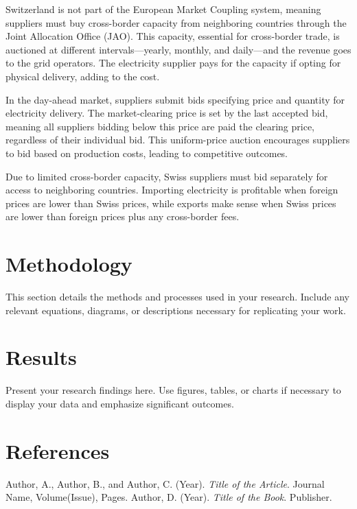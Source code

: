 \documentclass[12pt]{article}
\begin{document}
Switzerland is not part of the European Market Coupling system, meaning
suppliers must buy cross-border capacity from neighboring countries through the
Joint Allocation Office (JAO). This capacity, essential for cross-border trade,
is auctioned at different intervals—yearly, monthly, and daily—and the revenue
goes to the grid operators. The electricity supplier pays for the capacity if
opting for physical delivery, adding to the cost.

In the day-ahead market, suppliers submit bids
specifying price and quantity for electricity delivery. The market-clearing
price is set by the last accepted bid, meaning all suppliers bidding below this
price are paid the clearing price, regardless of their individual bid. This
uniform-price auction encourages suppliers to bid based on production costs,
leading to competitive outcomes.

Due to limited cross-border capacity,
Swiss suppliers must bid separately for access to neighboring countries.
Importing electricity is profitable when foreign prices are lower than Swiss
prices, while exports make sense when Swiss prices are lower than foreign
prices plus any cross-border fees.

\newpage

\section{Methodology}
This section details the methods and processes used in your research. Include any relevant equations, diagrams, or descriptions necessary for replicating your work.

\newpage

\section{Results}
Present your research findings here. Use figures, tables, or charts if necessary to display your data and emphasize significant outcomes.

\newpage

\section{References}

 Author, A., Author, B., and Author, C. (Year). \textit{Title of the Article}. Journal Name, Volume(Issue), Pages.
 Author, D. (Year). \textit{Title of the Book}. Publisher.
\end{document}
